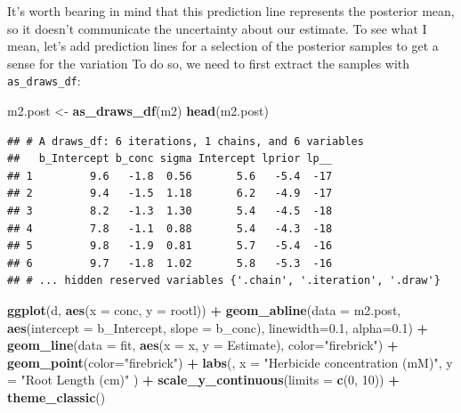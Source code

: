 \documentclass[
]{book}
\newenvironment{Shaded}{\begin{snugshade}}{\end{snugshade}}
\newcommand{\AttributeTok}[1]{\textcolor[rgb]{0.13,0.29,0.53}{#1}}
\newcommand{\DecValTok}[1]{\textcolor[rgb]{0.00,0.00,0.81}{#1}}
\newcommand{\FloatTok}[1]{\textcolor[rgb]{0.00,0.00,0.81}{#1}}
\newcommand{\FunctionTok}[1]{\textcolor[rgb]{0.13,0.29,0.53}{\textbf{#1}}}
\newcommand{\NormalTok}[1]{#1}
\newcommand{\OtherTok}[1]{\textcolor[rgb]{0.56,0.35,0.01}{#1}}
\newcommand{\SpecialCharTok}[1]{\textcolor[rgb]{0.81,0.36,0.00}{\textbf{#1}}}
\newcommand{\StringTok}[1]{\textcolor[rgb]{0.31,0.60,0.02}{#1}}
\begin{document}
It's worth bearing in mind that this prediction line represents the posterior mean, so it doesn't communicate the uncertainty about our estimate. To see what I mean, let's add prediction lines for a selection of the posterior samples to get a sense for the variation To do so, we need to first extract the samples with \texttt{as\_draws\_df}:

\begin{Shaded}
\begin{Highlighting}[]
\NormalTok{m2.post }\OtherTok{\textless{}{-}} \FunctionTok{as\_draws\_df}\NormalTok{(m2)}
\FunctionTok{head}\NormalTok{(m2.post)}
\end{Highlighting}
\end{Shaded}

\begin{verbatim}
## # A draws_df: 6 iterations, 1 chains, and 6 variables
##   b_Intercept b_conc sigma Intercept lprior lp__
## 1         9.6   -1.8  0.56       5.6   -5.4  -17
## 2         9.4   -1.5  1.18       6.2   -4.9  -17
## 3         8.2   -1.3  1.30       5.4   -4.5  -18
## 4         7.8   -1.1  0.88       5.4   -4.3  -18
## 5         9.8   -1.9  0.81       5.7   -5.4  -16
## 6         9.7   -1.8  1.02       5.8   -5.3  -16
## # ... hidden reserved variables {'.chain', '.iteration', '.draw'}
\end{verbatim}

\begin{Shaded}
\begin{Highlighting}[]
\FunctionTok{ggplot}\NormalTok{(d, }\FunctionTok{aes}\NormalTok{(}\AttributeTok{x =}\NormalTok{ conc, }\AttributeTok{y =}\NormalTok{ rootl)) }\SpecialCharTok{+}
  \FunctionTok{geom\_abline}\NormalTok{(}\AttributeTok{data =}\NormalTok{ m2.post, }
              \FunctionTok{aes}\NormalTok{(}\AttributeTok{intercept =}\NormalTok{ b\_Intercept, }\AttributeTok{slope =}\NormalTok{ b\_conc),}
              \AttributeTok{linewidth=}\FloatTok{0.1}\NormalTok{, }\AttributeTok{alpha=}\FloatTok{0.1}\NormalTok{) }\SpecialCharTok{+}
  \FunctionTok{geom\_line}\NormalTok{(}\AttributeTok{data =}\NormalTok{ fit, }\FunctionTok{aes}\NormalTok{(}\AttributeTok{x =}\NormalTok{ x, }\AttributeTok{y =}\NormalTok{ Estimate), }\AttributeTok{color=}\StringTok{"firebrick"}\NormalTok{) }\SpecialCharTok{+}
  \FunctionTok{geom\_point}\NormalTok{(}\AttributeTok{color=}\StringTok{"firebrick"}\NormalTok{) }\SpecialCharTok{+}
  \FunctionTok{labs}\NormalTok{(,}
    \AttributeTok{x =} \StringTok{"Herbicide concentration (mM)"}\NormalTok{,}
    \AttributeTok{y =} \StringTok{"Root Length (cm)"}
\NormalTok{  ) }\SpecialCharTok{+}
  \FunctionTok{scale\_y\_continuous}\NormalTok{(}\AttributeTok{limits =} \FunctionTok{c}\NormalTok{(}\DecValTok{0}\NormalTok{, }\DecValTok{10}\NormalTok{)) }\SpecialCharTok{+} 
  \FunctionTok{theme\_classic}\NormalTok{()}
\end{Highlighting}
\end{Shaded}
\end{document}

